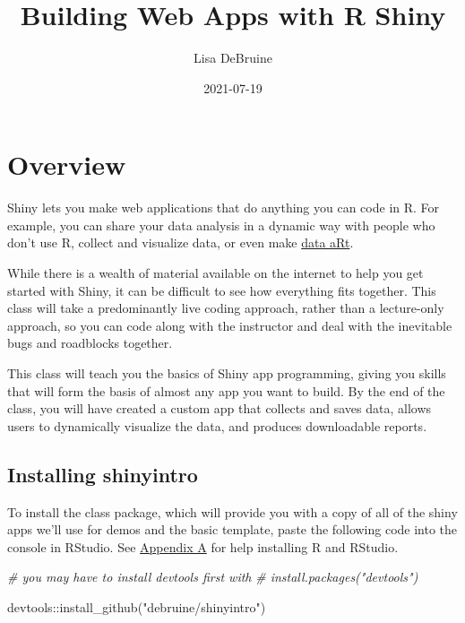 \documentclass[
]{book}
\title{Building Web Apps with R Shiny}
\author{Lisa DeBruine}
\date{2021-07-19}
\newenvironment{Shaded}{\begin{snugshade}}{\end{snugshade}}
\newcommand{\CommentTok}[1]{\textcolor[rgb]{0.56,0.35,0.01}{\textit{#1}}}
\newcommand{\FunctionTok}[1]{\textcolor[rgb]{0.00,0.00,0.00}{#1}}
\newcommand{\NormalTok}[1]{#1}
\newcommand{\SpecialCharTok}[1]{\textcolor[rgb]{0.00,0.00,0.00}{#1}}
\newcommand{\StringTok}[1]{\textcolor[rgb]{0.31,0.60,0.02}{#1}}
\begin{document}
\maketitle

{
\setcounter{tocdepth}{1}
\tableofcontents
}
\hypertarget{overview}{%
\chapter*{Overview}\label{overview}}

Shiny lets you make web applications that do anything you can code in R. For example, you can share your data analysis in a dynamic way with people who don't use R, collect and visualize data, or even make \href{https://towardsdatascience.com/getting-started-with-generative-art-in-r-3bc50067d34b}{data aRt}.

While there is a wealth of material available on the internet to help you get started with Shiny, it can be difficult to see how everything fits together. This class will take a predominantly live coding approach, rather than a lecture-only approach, so you can code along with the instructor and deal with the inevitable bugs and roadblocks together.

This class will teach you the basics of Shiny app programming, giving you skills that will form the basis of almost any app you want to build. By the end of the class, you will have created a custom app that collects and saves data, allows users to dynamically visualize the data, and produces downloadable reports.

\hypertarget{installing-shinyintro}{%
\section{Installing shinyintro}\label{installing-shinyintro}}

To install the class package, which will provide you with a copy of all of the shiny apps we'll use for demos and the basic template, paste the following code into the console in RStudio. See \protect\hyperlink{installing-r}{Appendix A} for help installing R and RStudio.

\begin{Shaded}
\begin{Highlighting}[]
\CommentTok{\# you may have to install devtools first with }
\CommentTok{\# install.packages("devtools")}

\NormalTok{devtools}\SpecialCharTok{::}\FunctionTok{install\_github}\NormalTok{(}\StringTok{"debruine/shinyintro"}\NormalTok{)}
\end{Highlighting}
\end{Shaded}
\end{document}

